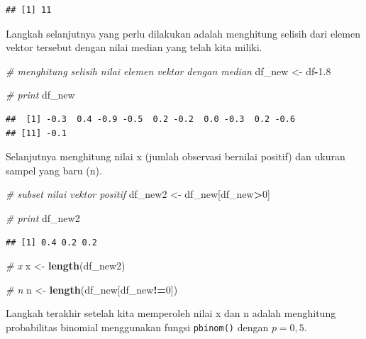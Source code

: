 \documentclass[]{book}
\newenvironment{Shaded}{\begin{snugshade}}{\end{snugshade}}
\newcommand{\KeywordTok}[1]{\textcolor[rgb]{0.13,0.29,0.53}{\textbf{#1}}}
\newcommand{\DecValTok}[1]{\textcolor[rgb]{0.00,0.00,0.81}{#1}}
\newcommand{\FloatTok}[1]{\textcolor[rgb]{0.00,0.00,0.81}{#1}}
\newcommand{\StringTok}[1]{\textcolor[rgb]{0.31,0.60,0.02}{#1}}
\newcommand{\CommentTok}[1]{\textcolor[rgb]{0.56,0.35,0.01}{\textit{#1}}}
\newcommand{\OperatorTok}[1]{\textcolor[rgb]{0.81,0.36,0.00}{\textbf{#1}}}
\newcommand{\NormalTok}[1]{#1}
\begin{document}
\begin{verbatim}
## [1] 11
\end{verbatim}

Langkah selanjutnya yang perlu dilakukan adalah menghitung selisih dari
elemen vektor tersebut dengan nilai median yang telah kita miliki.

\begin{Shaded}
\begin{Highlighting}[]
\CommentTok{# menghitung selisih nilai elemen vektor dengan median}
\NormalTok{df_new <-}\StringTok{ }\NormalTok{df}\OperatorTok{-}\FloatTok{1.8}

\CommentTok{# print}
\NormalTok{df_new}
\end{Highlighting}
\end{Shaded}

\begin{verbatim}
##  [1] -0.3  0.4 -0.9 -0.5  0.2 -0.2  0.0 -0.3  0.2 -0.6
## [11] -0.1
\end{verbatim}

Selanjutnya menghitung nilai x (jumlah observasi bernilai positif) dan
ukuran sampel yang baru (n).

\begin{Shaded}
\begin{Highlighting}[]
\CommentTok{# subset nilai vektor positif}
\NormalTok{df_new2 <-}\StringTok{ }\NormalTok{df_new[df_new}\OperatorTok{>}\DecValTok{0}\NormalTok{]}

\CommentTok{# print}
\NormalTok{df_new2}
\end{Highlighting}
\end{Shaded}

\begin{verbatim}
## [1] 0.4 0.2 0.2
\end{verbatim}

\begin{Shaded}
\begin{Highlighting}[]
\CommentTok{# x}
\NormalTok{x <-}\StringTok{ }\KeywordTok{length}\NormalTok{(df_new2)}

\CommentTok{# n}
\NormalTok{n <-}\StringTok{ }\KeywordTok{length}\NormalTok{(df_new[df_new}\OperatorTok{!=}\DecValTok{0}\NormalTok{])}
\end{Highlighting}
\end{Shaded}

Langkah terakhir setelah kita memperoleh nilai x dan n adalah menghitung
probabilitas binomial menggunakan fungsi \texttt{pbinom()} dengan
\(p=0,5\).
\end{document}
